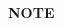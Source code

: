 \documentclass[a4paper, 15pt]{article}
\begin{document}
\begin{adjustwidth}{2in}{}
			 
		\newpage
		
		{\LARGE \textbf{NOTE}}	
			
	
	
	
	
	
	
	
	
	
	
	
	
	
	
	
	
	
	
	
	
	
	
	
	
	
	
	
	
	
	
	
	
	
	
	
	
	
	
	
	
	
	
	
	
	
	
	
	
	
	
	
	
	
	
	
	
	
	
	
	
	
	
	
	
	
	
	
	
	
	
	
	
	
	
	
	
	
	
	
	
	
	
	
	
	
	
	
	
	
	
	
	
	
	
	
	
	
	
	
	
	
	
	
	
	
	
	
	
	
	
	
	
	
	
	
	
	
	
	
	
	
	
	
	
	
\end{adjustwidth}
\end{document}

